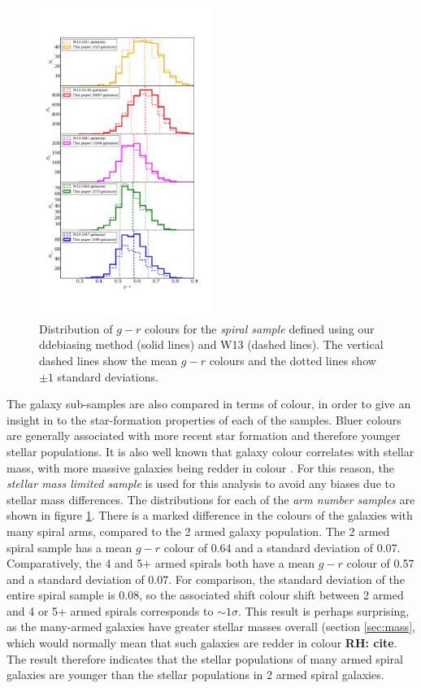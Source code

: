 \documentclass[useAMS,usenatbib]{mn2e}
\newcommand{\rh}[1]{{\bf \textcolor{RoyalPurple}{RH: #1}}}
\begin{document}
\begin{figure}
		\centering

        \includegraphics[width=0.5\textwidth]{Histograms/colour_histogram.pdf}

        \caption{Distribution of $g-r$ colours for the \textit{spiral sample} defined using our ddebiasing method (solid lines) and W13 (dashed lines). The vertical dashed lines show the mean $g-r$ colours and the dotted lines show $\pm1$ standard deviations.}

        \label{fig:colour_histogram}

\end{figure}

The galaxy sub-samples are also compared in terms of colour, in order to give an insight in to the star-formation properties of each of the samples. Bluer colours are generally associated with more recent star formation and therefore younger stellar populations. It is also well known that galaxy colour correlates with stellar mass, with more massive galaxies being redder in colour \citep{Baldry_06}. For this reason, the \textit{stellar mass limited sample} is used for this analysis to avoid any biases due to stellar mass differences. The distributions for each of the \textit{arm number samples} are shown in figure \ref{fig:colour_histogram}. There is a marked difference in the colours of the galaxies with many spiral arms, compared to the 2 armed galaxy population. The 2 armed spiral sample has a mean $g-r$ colour of 0.64 and a standard deviation of 0.07. Comparatively, the 4 and 5+ armed spirals both have a mean $g-r$ colour of 0.57 and a standard deviation of 0.07. For comparison, the standard deviation of the entire spiral sample is 0.08, so the associated shift colour shift between 2 armed and 4 or 5+ armed spirals corresponds to $\sim 1 \sigma$. This result is perhaps surprising, as the many-armed galaxies have greater stellar masses overall (section \ref{sec:mass}, which would normally mean that such galaxies are redder in colour \rh{cite}. The result therefore indicates that the stellar populations of many armed spiral galaxies are younger than the stellar populations in 2 armed spiral galaxies.
\end{document}
